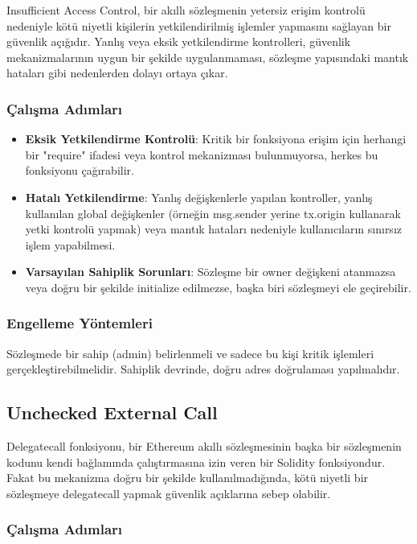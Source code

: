 Insufficient Access Control, bir akıllı sözleşmenin yetersiz erişim kontrolü nedeniyle kötü niyetli kişilerin yetkilendirilmiş işlemler yapmasını sağlayan bir güvenlik açığıdır. Yanlış veya eksik yetkilendirme kontrolleri, güvenlik mekanizmalarının uygun bir şekilde uygulanmaması, sözleşme yapısındaki mantık hataları gibi nedenlerden dolayı ortaya çıkar. 

\subsubsection{Çalışma Adımları}

\begin{itemize}
    \item \textbf{Eksik Yetkilendirme Kontrolü}: Kritik bir fonksiyona erişim için herhangi bir "require" ifadesi veya kontrol mekanizması bulunmuyorsa, herkes bu fonksiyonu çağırabilir.
    \item \textbf{Hatalı Yetkilendirme}: Yanlış değişkenlerle yapılan kontroller, yanlış kullanılan global değişkenler (örneğin msg.sender yerine tx.origin kullanarak yetki kontrolü yapmak) veya mantık hataları nedeniyle kullanıcıların sınırsız işlem yapabilmesi.
    \item \textbf{Varsayılan Sahiplik Sorunları}: Sözleşme bir owner değişkeni atanmazsa veya doğru bir şekilde initialize edilmezse, başka biri sözleşmeyi ele geçirebilir.
\end{itemize}

\subsubsection{Engelleme Yöntemleri}

Sözleşmede bir sahip (admin) belirlenmeli ve sadece bu kişi kritik işlemleri gerçekleştirebilmelidir. Sahiplik devrinde, doğru adres doğrulaması yapılmalıdır.

\newpage

\subsection{Unchecked External Call}

Delegatecall fonksiyonu, bir Ethereum akıllı sözleşmesinin başka bir sözleşmenin kodunu kendi bağlamında çalıştırmasına izin veren bir Solidity fonksiyondur. Fakat bu mekanizma doğru bir şekilde kullanılmadığında, kötü niyetli bir sözleşmeye delegatecall yapmak güvenlik açıklarına sebep olabilir.

\subsubsection{Çalışma Adımları}

